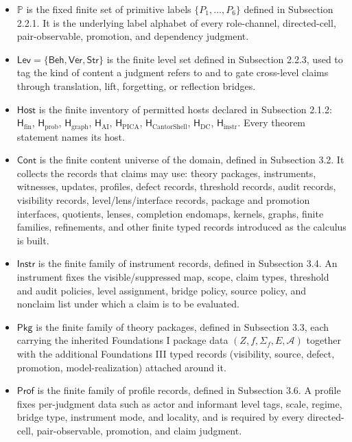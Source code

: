 \documentclass[11pt]{article}
\providecommand{\tightlist}{}
\theoremstyle{definition}
\begin{document}
\begin{itemize}
\tightlist
\item
  \(\mathbb P\) is the fixed finite set of primitive labels \(\{P_1,\ldots,P_6\}\) defined in Subsection 2.2.1. It is the underlying label alphabet of every role-channel, directed-cell, pair-observable, promotion, and dependency judgment.
\item
  \(\mathsf{Lev}=\{\mathsf{Beh},\mathsf{Ver},\mathsf{Str}\}\) is the finite level set defined in Subsection 2.2.3, used to tag the kind of content a judgment refers to and to gate cross-level claims through translation, lift, forgetting, or reflection bridges.
\item
  \(\mathsf{Host}\) is the finite inventory of permitted hosts declared in Subsection 2.1.2: \(\mathsf H_{\mathrm{fin}}\), \(\mathsf H_{\mathrm{prob}}\), \(\mathsf H_{\mathrm{graph}}\), \(\mathsf H_{\mathrm{AI}}\), \(\mathsf H_{\mathrm{PICA}}\), \(\mathsf H_{\mathrm{CantorShell}}\), \(\mathsf H_{\mathrm{DC}}\), \(\mathsf H_{\mathrm{instr}}\). Every theorem statement names its host.
\item
  \(\mathsf{Cont}\) is the finite content universe of the domain, defined in Subsection 3.2. It collects the records that claims may use: theory packages, instruments, witnesses, updates, profiles, defect records, threshold records, audit records, visibility records, level/lens/interface records, package and promotion interfaces, quotients, lenses, completion endomaps, kernels, graphs, finite families, refinements, and other finite typed records introduced as the calculus is built.
\item
  \(\mathsf{Instr}\) is the finite family of instrument records, defined in Subsection 3.4. An instrument fixes the visible/suppressed map, scope, claim types, threshold and audit policies, level assignment, bridge policy, source policy, and nonclaim list under which a claim is to be evaluated.
\item
  \(\mathsf{Pkg}\) is the finite family of theory packages, defined in Subsection 3.3, each carrying the inherited Foundations I package data \((Z,f,\Sigma_f,E,\mathcal A)\) together with the additional Foundations III typed records (visibility, source, defect, promotion, model-realization) attached around it.
\item
  \(\mathsf{Prof}\) is the finite family of profile records, defined in Subsection 3.6. A profile fixes per-judgment data such as actor and informant level tags, scale, regime, bridge type, instrument mode, and locality, and is required by every directed-cell, pair-observable, promotion, and claim judgment.

\end{itemize}
\end{document}
